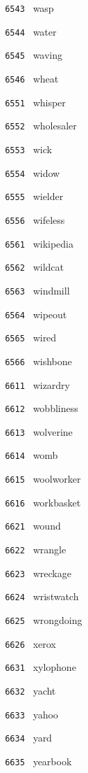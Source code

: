 \documentclass[11pt]{article}
\begin{document}
\begin{multicols}{6}
\noindent \texttt{ 6543 } wasp  \par
\noindent \texttt{ 6544 } water  \par
\noindent \texttt{ 6545 } waving  \par
\noindent \texttt{ 6546 } wheat  \par
\noindent \texttt{ 6551 } whisper  \par
\noindent \texttt{ 6552 } wholesaler  \par
\noindent \texttt{ 6553 } wick  \par
\noindent \texttt{ 6554 } widow  \par
\noindent \texttt{ 6555 } wielder  \par
\noindent \texttt{ 6556 } wifeless  \par
\noindent \texttt{ 6561 } wikipedia  \par
\noindent \texttt{ 6562 } wildcat  \par
\noindent \texttt{ 6563 } windmill  \par
\noindent \texttt{ 6564 } wipeout  \par
\noindent \texttt{ 6565 } wired  \par
\noindent \texttt{ 6566 } wishbone  \par
\noindent \texttt{ 6611 } wizardry  \par
\noindent \texttt{ 6612 } wobbliness  \par
\noindent \texttt{ 6613 } wolverine  \par
\noindent \texttt{ 6614 } womb  \par
\noindent \texttt{ 6615 } woolworker  \par
\noindent \texttt{ 6616 } workbasket  \par
\noindent \texttt{ 6621 } wound  \par
\noindent \texttt{ 6622 } wrangle  \par
\noindent \texttt{ 6623 } wreckage  \par
\noindent \texttt{ 6624 } wristwatch  \par
\noindent \texttt{ 6625 } wrongdoing  \par
\noindent \texttt{ 6626 } xerox  \par
\noindent \texttt{ 6631 } xylophone  \par
\noindent \texttt{ 6632 } yacht  \par
\noindent \texttt{ 6633 } yahoo  \par
\noindent \texttt{ 6634 } yard  \par
\noindent \texttt{ 6635 } yearbook  \par

\end{multicols}
\end{document}
